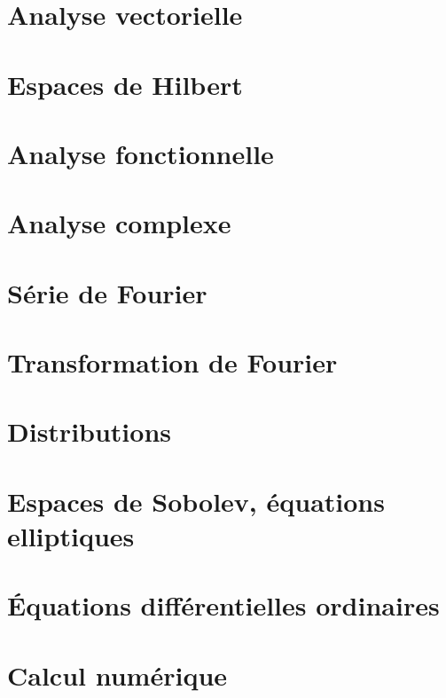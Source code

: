 \chapter{Analyse vectorielle}


\chapter{Espaces de Hilbert}


\chapter{Analyse fonctionnelle}



\chapter{Analyse complexe}          \label{ChapICHIooXbLccl}



\chapter{Série de Fourier}


\chapter{Transformation de Fourier}


\chapter{Distributions}


\chapter{Espaces de Sobolev, équations elliptiques}      \label{CHAPooVTIIooGOEvXT}


\chapter{Équations différentielles ordinaires}




\chapter{Calcul numérique}




